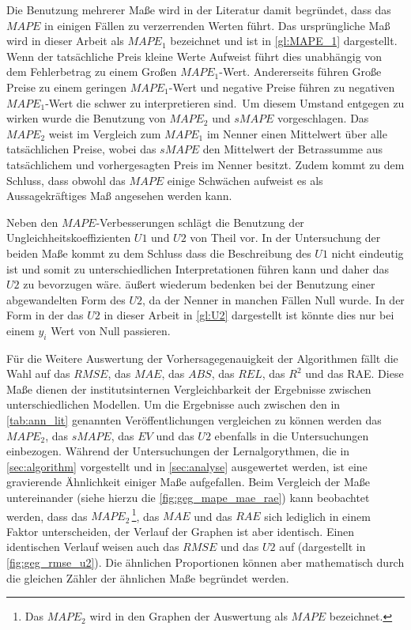 Die Benutzung mehrerer Maße wird in der Literatur damit begründet, dass das $MAPE$ in einigen Fällen zu verzerrenden Werten führt. Das ursprüngliche Maß wird in dieser Arbeit als $MAPE_1$ bezeichnet und ist in \autoref{gl:MAPE_1} dargestellt. Wenn der tatsächliche Preis kleine Werte Aufweist führt dies unabhängig von dem Fehlerbetrag zu einem Großen $MAPE_1$-Wert. Andererseits führen Große Preise zu einem geringen $MAPE_1$-Wert und negative Preise führen zu negativen $MAPE_1$-Wert die schwer zu interpretieren sind.\, Um diesem Umstand entgegen zu wirken wurde die Benutzung von $MAPE_2$ und $sMAPE$ vorgeschlagen. Das $MAPE_2$ weist im Vergleich zum $MAPE_1$ im Nenner einen Mittelwert über alle tatsächlichen Preise, wobei das $sMAPE$ den Mittelwert der Betrassumme aus tatsächlichem und vorhergesagten Preis im Nenner besitzt. Zudem kommt \citet{Makridakis1993} zu dem Schluss, dass obwohl das $MAPE$ einige Schwächen aufweist es als Aussagekräftiges Maß angesehen werden kann.

Neben den $MAPE$-Verbesserungen schlägt \citet{Panapakidis2016} die Benutzung der Ungleichheitskoeffizienten $U1$ und $U2$ von Theil vor. In der Untersuchung der beiden Maße kommt \citet{Bliemel1973} zu dem Schluss dass die Beschreibung des $U1$ nicht eindeutig ist und somit zu unterschiedlichen Interpretationen führen kann und daher das $U2$ zu bevorzugen wäre. \citet{Makridakis1993} äußert wiederum bedenken bei der Benutzung einer abgewandelten Form des $U2$, da der Nenner in manchen Fällen Null wurde. In der Form in der das $U2$ in dieser Arbeit in \autoref{gl:U2} dargestellt ist könnte dies nur bei einem $y_i$ Wert von Null passieren.

Für die Weitere Auswertung der Vorhersagegenauigkeit der Algorithmen fällt die Wahl auf das $RMSE$, das $MAE$, das $ABS$, das $REL$, das $R^2$ und das RAE. Diese Maße dienen der institutsinternen Vergleichbarkeit der Ergebnisse zwischen unterschiedlichen Modellen. Um die Ergebnisse auch zwischen den in \autoref{tab:ann_lit} genannten Veröffentlichungen vergleichen zu können werden das $MAPE_2$, das $sMAPE$, das $EV$ und das $U2$ ebenfalls in die Untersuchungen einbezogen.
Während der Untersuchungen der Lernalgorythmen, die in \autoref{sec:algorithm} vorgestellt und in \autoref{sec:analyse} ausgewertet werden, ist eine gravierende Ähnlichkeit einiger Maße aufgefallen. Beim Vergleich der Maße untereinander (siehe hierzu die \autoref{fig:geg_mape_mae_rae}) kann beobachtet werden, dass das $MAPE_2$\,\footnote{Das $MAPE_2$ wird in den Graphen der Auswertung als $MAPE$ bezeichnet.}, das $MAE$ und das $RAE$ sich lediglich in einem Faktor unterscheiden, der Verlauf der Graphen ist aber identisch. Einen identischen Verlauf weisen auch das $RMSE$ und das $U2$ auf (dargestellt in \autoref{fig:geg_rmse_u2}). Die ähnlichen Proportionen können aber mathematisch durch die gleichen Zähler der ähnlichen Maße begründet werden. 

